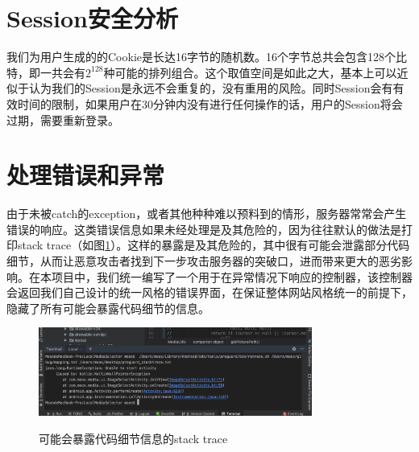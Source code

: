 \section{Session安全分析}\label{sec:sessionS}

我们为用户生成的的Cookie是长达16字节的随机数。16个字节总共会包含128个比特，即一共会有$2^{128}$种可能的排列组合。这个取值空间是如此之大，基本上可以近似于认为我们的Session是永远不会重复的，没有重用的风险。同时Session会有有效时间的限制，如果用户在30分钟内没有进行任何操作的话，用户的Session将会过期，需要重新登录。

\section{处理错误和异常}

由于未被catch的exception，或者其他种种难以预料到的情形，服务器常常会产生错误的响应。这类错误信息如果未经处理是及其危险的，因为往往默认的做法是打印stack trace（如图\ref{fig:stacktrace}）。这样的暴露是及其危险的，其中很有可能会泄露部分代码细节，从而让恶意攻击者找到下一步攻击服务器的突破口，进而带来更大的恶劣影响。在本项目中，我们统一编写了一个用于在异常情况下响应的控制器，该控制器会返回我们自己设计的统一风格的错误界面，在保证整体网站风格统一的前提下，隐藏了所有可能会暴露代码细节的信息。

\begin{figure}[!htb]
	\centering
	\includegraphics[width=0.8\textwidth]
	{figures/stacktrace.jpg}\\
	\caption{可能会暴露代码细节信息的stack trace}
	\label{fig:stacktrace}
\end{figure}



